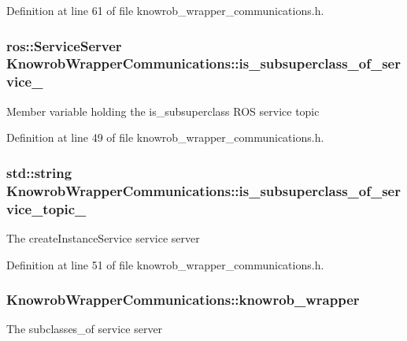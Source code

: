 Definition at line 61 of file knowrob\-\_\-wrapper\-\_\-communications.\-h.

\hypertarget{classKnowrobWrapperCommunications_a9b20954a7983e1a0f842161d06555484}{
\subsubsection[{is\-\_\-subsuperclass\-\_\-of\-\_\-service\-\_\-}]{\setlength{\rightskip}{0pt plus 5cm}ros\-::\-Service\-Server Knowrob\-Wrapper\-Communications\-::is\-\_\-subsuperclass\-\_\-of\-\_\-service\-\_\-\hspace{0.3cm}{\ttfamily [private]}}}\label{classKnowrobWrapperCommunications_a9b20954a7983e1a0f842161d06555484}
Member variable holding the is\-\_\-subsuperclass R\-O\-S service topic 

Definition at line 49 of file knowrob\-\_\-wrapper\-\_\-communications.\-h.

\hypertarget{classKnowrobWrapperCommunications_ab7d3b5d16106e51472f8fcb771be96aa}{
\subsubsection[{is\-\_\-subsuperclass\-\_\-of\-\_\-service\-\_\-topic\-\_\-}]{\setlength{\rightskip}{0pt plus 5cm}std\-::string Knowrob\-Wrapper\-Communications\-::is\-\_\-subsuperclass\-\_\-of\-\_\-service\-\_\-topic\-\_\-\hspace{0.3cm}{\ttfamily [private]}}}\label{classKnowrobWrapperCommunications_ab7d3b5d16106e51472f8fcb771be96aa}
The create\-Instance\-Service service server 

Definition at line 51 of file knowrob\-\_\-wrapper\-\_\-communications.\-h.

\hypertarget{classKnowrobWrapperCommunications_a6f4d52c56702c85b21b96df9caf95f46}{
\subsubsection[{knowrob\-\_\-wrapper}]{ Knowrob\-Wrapper\-Communications\-::knowrob\-\_\-wrapper\hspace{0.3cm}{\ttfamily [private]}}}\label{classKnowrobWrapperCommunications_a6f4d52c56702c85b21b96df9caf95f46}
The subclasses\-\_\-of service server 


